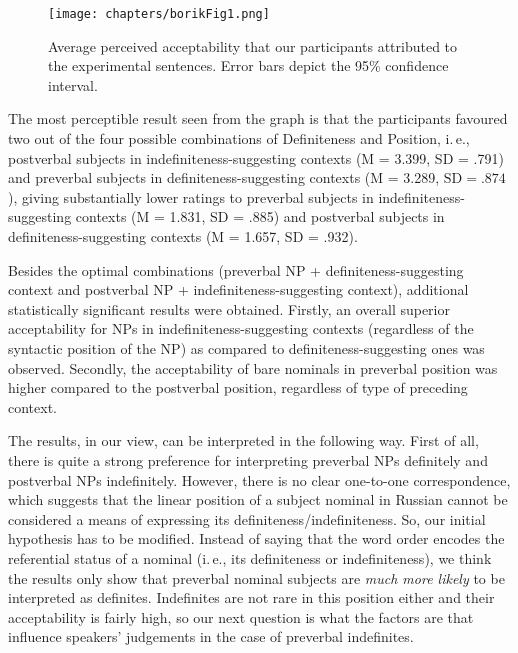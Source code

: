 \documentclass[output=paper]{langsci/langscibook}
\begin{document}
\begin{figure}
\centering
\texttt{[image: chapters/borikFig1.png]}
\caption{Average perceived acceptability that our participants attributed to the experimental sentences. Error bars depict the 95\% confidence interval.}\label{2fig:1}
\end{figure}

{
\hspace*{-1.5mm}The most perceptible result seen from the graph is that the participants favoured two out of the four possible combinations of Definiteness and Position, i.\,e., postverbal subjects in indefiniteness-suggesting contexts (M = 3.399, SD = .791) and preverbal subjects in definiteness-suggesting contexts (M = 3.289, $\text{SD} = .874$), giving substantially lower ratings to preverbal subjects in indefiniteness-suggesting contexts (M = 1.831, SD = .885) and postverbal subjects in definiteness-suggesting contexts (M = 1.657, SD = .932).
}

Besides the optimal combinations (preverbal NP + definiteness-suggesting context and postverbal NP + indefiniteness-suggesting context), additional statistically significant results were obtained. Firstly, an overall superior acceptability for NPs in indefiniteness-suggesting contexts (regardless of the syntactic position of the NP) as compared to definiteness-suggesting ones was observed. Secondly, the acceptability of bare nominals in preverbal position was higher compared to the postverbal position, regardless of type of preceding context.

The results, in our view, can be interpreted in the following way. First of all, there is quite a strong preference for interpreting preverbal NPs definitely and postverbal NPs indefinitely. However, there is no clear one-to-one correspondence, which suggests that the linear position of a subject nominal in Russian cannot be considered a means of expressing its definiteness/indefiniteness. So, our initial hypothesis has to be modified. Instead of saying that the word order encodes the referential status of a nominal (i.\,e., its definiteness or indefiniteness), we think the results only show that preverbal nominal subjects are {\emph{much more likely}} to be interpreted as definites. Indefinites are not rare in this position either and their acceptability is fairly high, so our next question is what the factors are that influence speakers' judgements in the case of preverbal indefinites. 
\end{document}
